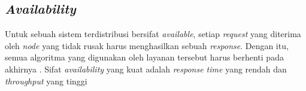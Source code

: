 \subsection{\textit{Availability}}

Untuk sebuah sistem terdistribusi bersifat \textit{available}, setiap \textit{request} yang diterima oleh \textit{node} yang tidak rusak harus menghasilkan sebuah \textit{response}. Dengan itu, semua algoritma yang digunakan oleh layanan tersebut harus berhenti pada akhirnya \parencite{gilbert2002brewer}. Sifat \textit{availability} yang kuat adalah \textit{response time} yang rendah dan \textit{throughput} yang tinggi